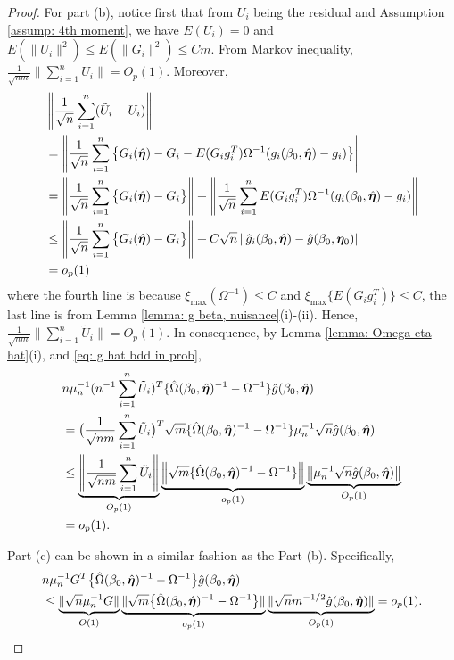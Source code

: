 \documentclass[12pt]{article}
\begin{document}
{\begin{proof}
For part (b), notice first that from $U_i$ being the residual and Assumption \ref{assump: 4th moment}, we have $E(U_i)=0$ and $E(\|U_i\|^2) \leq E(\|G_i\|^2) \leq Cm  $. From Markov inequality, $\frac{1}{\sqrt{nm}} \| \sum_{i=1}^n U_i \|=  O_p(1)$. Moreover, 
\begin{align}
    &\left\|\frac{1}{\sqrt{n}} \sum_{i=1}^n ( \tilde U_i- U_i) \right\| \label{eq: U_i}\\
    &=  \left\| \frac{1}{\sqrt{n}} \sum_{i=1}^n \big\{G_i(\hat{\bm \eta}) - G_i -  E(G_ig_i^T)\Omega^{-1} (g_i(\beta_0, \hat{\bm \eta}) - g_i) \big\} \right\| \nonumber \\
    &=  \left\| \frac{1}{\sqrt{n}} \sum_{i=1}^n \big\{G_i( \hat{\bm \eta}) - G_i \big\} \right\| +\left\| \frac{1}{\sqrt{n}} \sum_{i=1}^n  E(G_ig_i^T)\Omega^{-1} (g_i(\beta_0, \hat{\bm \eta}) - g_i)  \right\| \nonumber\\
     &\leq  \left\|  \frac{1}{\sqrt{n}} \sum_{i=1}^n \big\{G_i(\hat{\bm \eta}) - G_i \big\} \right\| + C\sqrt{n} \left\| \hat g_i(\beta_0, \hat{\bm \eta}) - \hat g(\beta_0,\bm \eta_0)  \right\| \nonumber\\
     &= o_p(1) \nonumber
\end{align}
where the fourth line is because $\xi_{\max}(\Omega^{-1})\leq C$  and $\xi_{\max}\{E(G_ig_i^T)\} \leq C  $, the last line  is from Lemma \ref{lemma: g beta, nuisance}(i)-(ii).   Hence, $\frac{1}{\sqrt{nm} } \|\sum_{i=1}^n \tilde U_i \| =  O_p(1)$. In consequence, by Lemma \ref{lemma: Omega eta hat}(i), and \eqref{eq: g hat bdd in prob},  
\begin{align*}
	&n\mu_n^{-1}( n^{-1} \sum_{i=1}^n\tilde U_i)^T \{\hat \Omega(\beta_0,\hat{\bm \eta})^{-1} - \Omega^{-1}\}\hat g(\beta_0,\hat{\bm \eta})\\
     &=  \big( \frac{1}{\sqrt{nm}}\sum_{i=1}^n\tilde U_i\big)^T \sqrt{m}\{\hat \Omega(\beta_0,\hat{\bm \eta})^{-1} - \Omega^{-1}\} \mu_n^{-1}\sqrt{n}\hat g(\beta_0,\hat{\bm \eta}) \\
     &\leq \underbrace{\left\| \frac{1}{\sqrt{nm}}\sum_{i=1}^n\tilde U_i\right\|}_{O_p(1)} \underbrace{\left\| \sqrt{m}\{\hat \Omega(\beta_0,\hat{\bm \eta})^{-1} - \Omega^{-1}\} \right\|}_{o_p(1)} \underbrace{\left\| \mu_n^{-1}\sqrt{n}\hat g(\beta_0,\hat{\bm \eta}) \right\|}_{O_p(1)}\\
     &= o_p(1).
\end{align*}

Part (c) can be shown in a similar fashion as the Part (b). Specifically,
\begin{align*}
    &n\mu_n^{-1} G^T \big\{\hat \Omega(\beta_0,\hat{\bm \eta})^{-1} - \Omega^{-1} \big\} \hat g(\beta_0,\hat{\bm \eta}) \\
    &\leq \underbrace{\|\sqrt{n} \mu_n^{-1} G \|}_{O(1)} \underbrace{\| \sqrt{m}\big\{\hat \Omega(\beta_0,\hat{\bm \eta})^{-1} - \Omega^{-1} \big\} \|}_{o_p(1) } \underbrace{\| \sqrt{n}m^{-1/2}\hat g(\beta_0,\hat{\bm \eta}) \|}_{O_p(1)}= o_p(1).
\end{align*}


\end{proof}}
\end{document}
